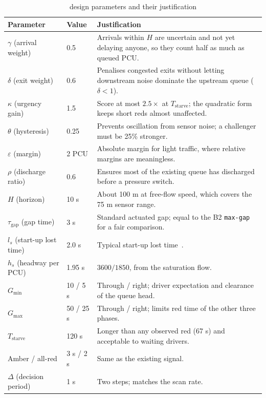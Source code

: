 \begin{table}[htbp]
\centering
\caption{\prism{} design parameters and their justification}\label{tab:impl-prism-params}
\small
\begin{tabularx}{\textwidth}{@{}ll>{\raggedright\arraybackslash}X@{}}
\toprule
Parameter & Value & Justification\\
\midrule
$\gamma$ (arrival weight) & 0.5 & Arrivals within $H$ are uncertain and not yet delaying anyone, so they count half as much as queued PCU.\\
$\delta$ (exit weight) & 0.6 & Penalises congested exits without letting downstream noise dominate the upstream queue ($\delta<1$).\\
$\kappa$ (urgency gain) & 1.5 & Score at most $2.5\times$ at $T_{\text{starve}}$; the quadratic form keeps short reds almost unaffected.\\
$\theta$ (hysteresis) & 0.25 & Prevents oscillation from sensor noise; a challenger must be 25\% stronger.\\
$\varepsilon$ (margin) & 2 PCU & Absolute margin for light traffic, where relative margins are meaningless.\\
$\rho$ (discharge ratio) & 0.6 & Ensures most of the existing queue has discharged before a pressure switch.\\
$H$ (horizon) & 10 s & About 100 m at free-flow speed, which covers the 75 m sensor range.\\
$\tau_{\text{gap}}$ (gap time) & 3 s & Standard actuated gap; equal to the B2 \texttt{max-gap} for a fair comparison.\\
$l_s$ (start-up lost time) & 2.0 s & Typical start-up lost time~\cite{hcm2016}.\\
$h_s$ (headway per PCU) & 1.95 s & $3600/1850$, from the \dtx{} saturation flow.\\
$G_{\min}$ & 10 / 5 s & Through / right; driver expectation and clearance of the queue head.\\
$G_{\max}$ & 50 / 25 s & Through / right; limits red time of the other three phases.\\
$T_{\text{starve}}$ & 120 s & Longer than any observed red (67 s) and acceptable to waiting drivers.\\
Amber / all-red & 3 s / 2 s & Same as the existing signal.\\
$\Delta$ (decision period) & 1 s & Two \sumo{} steps; matches the \vls{} scan rate.\\
\bottomrule
\end{tabularx}
\end{table}

